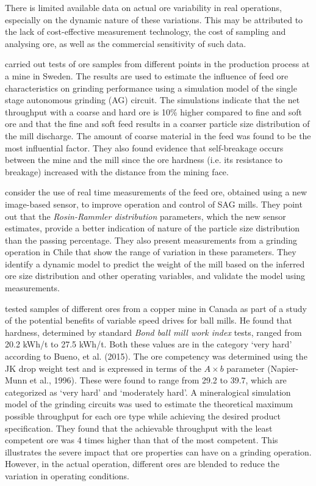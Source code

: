 There is limited available data on actual ore variability in real operations, especially on the dynamic nature of these variations. This may be attributed to the lack of cost-effective measurement technology, the cost of sampling and analysing ore, as well as the commercial sensitivity of such data.

\cite{hahne_ore_2003} carried out tests of ore samples from different points in the production process at a mine in Sweden. The results are used to estimate the influence of feed ore characteristics on grinding performance using a simulation model of the single stage autonomous grinding (AG) circuit. The simulations indicate that the net throughput with a coarse and hard ore is 10\% higher compared to fine and soft ore and that the fine and soft feed results in a coarser particle size distribution of the mill discharge. The amount of coarse material in the feed was found to be the most influential factor. They also found evidence that self-breakage occurs between the mine and the mill since the ore hardness (i.e. its resistance to breakage) increased with the distance from the mining face.

\cite{nunez_characterization_2011} consider the use of real time measurements of the feed ore, obtained using a new image-based sensor, to improve operation and control of \gls{SAG} mills. They point out that the \textit{Rosin-Rammler distribution} parameters, which the new sensor estimates, provide a better indication of nature of the particle size distribution than the passing percentage. They also present measurements from a grinding operation in Chile that show the range of variation in these parameters. They identify a dynamic model to predict the weight of the mill based on the inferred ore size distribution and other operating variables, and validate the model using measurements.

\cite{liu_development_2018} tested samples of different ores from a copper mine in Canada as part of a study of the potential benefits of variable speed drives for ball mills. He found that hardness, determined by standard \textit{Bond ball mill work index} tests, ranged from 20.2 kWh/t to 27.5 kWh/t. Both these values are in the category `very hard' according to Bueno, et al. (2015). The ore competency was determined using the JK drop weight test and is expressed in terms of the $A\times{b}$ parameter (Napier-Munn et al., 1996). These were found to range from 29.2 to 39.7, which are categorized as `very hard' and `moderately hard'. A mineralogical simulation model of the grinding circuits was used to estimate the theoretical maximum possible throughput for each ore type while achieving the desired product specification. They found that the achievable throughput with the least competent ore was 4 times higher than that of the most competent. This illustrates the severe impact that ore properties can have on a grinding operation. However, in the actual operation, different ores are blended to reduce the variation in operating conditions.

